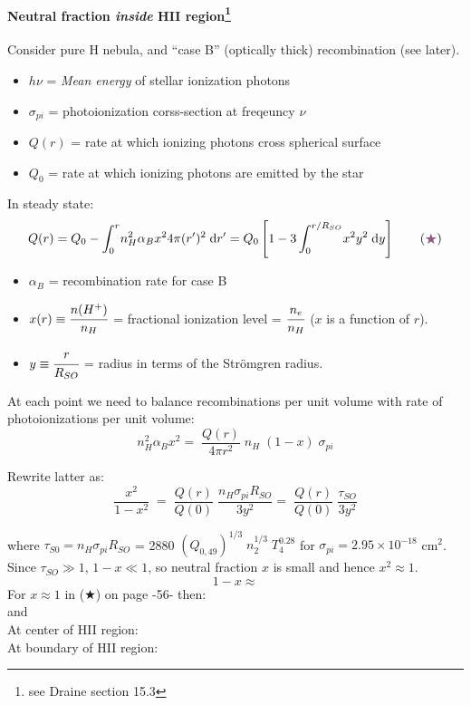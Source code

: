 \documentclass[11pt]{article}
\newcommand{\mar}[1]{\hspace{0pt}\marginpar{-\textcolor{black}{#1}-}}
\begin{document}
\paragraph{Neutral fraction \emph{inside} HII region\footnote{see Draine
section 15.3}}
\mar{56}Consider pure H nebula, and ``case B'' (optically thick)
recombination (see later).
\begin{itemize}
    \item $h\nu$ = \emph{Mean energy} of stellar ionization photons
    \item $\sigma_{pi}$ = photoionization corss-section at freqeuncy $\nu$
    \item $Q(r)$ = rate at which ionizing photons cross spherical surface
    \item $Q_{0}$ = rate at which ionizing photons are emitted by the star
\end{itemize}
In steady state:
\[
    Q(r)
    = Q_{0} - \int_{0}^{r}{\!
        n_{H}^{2} \alpha_{B} x^{2} 4\pi(r')^{2} \;\mathrm{d}r'}
    = Q_{0} \left[ 1 - 3\int_{0}^{r/R_{SO}}{\!
        x^{2}y^{2} \;\mathrm{d}y} \right]
    \qquad (\textcolor{mypur}{\bigstar})
    \]
\begin{itemize}[itemsep=1ex]
    \item $\alpha_{B}$ = recombination rate for case B
    \item $x(r) \equiv \cfrac{n(H^{+})}{n_{H}}$ = fractional ionization level
        = $\cfrac{n_{e}}{n_{H}}$ ($x$ is a function of $r$).
    \item $y \equiv \cfrac{r}{R_{SO}}$ = radius in terms of the
        Str\"{o}mgren radius.
\end{itemize}
At each point we need to balance recombinations per unit volume with rate of
photoionizations per unit volume:
\[
    n_{H}^{2} \alpha_{B} x^{2}
    =\; \frac{Q(r)}{4{\pi}r^{2}}\; n_{H}\; (1-x)\; \sigma_{pi}
    \]

\mar{57}Rewrite latter as:
\[
    \frac{x^{2}}{1-x^{2}}\;
    =\; \frac{Q(r)}{Q(0)}\; \frac{n_{H} \sigma_{pi} R_{SO}}{3y^{2}}
    =\; \frac{Q(r)}{Q(0)}\; \frac{\tau_{SO}}{3y^{2}}
    \]

where $\tau_{S0} = n_{H}\sigma_{pi}R_{SO}$
= 2880 $(Q_{0,49})^{1/3}\; n_{2}^{1/3}\; T_{4}^{0.28}$
for $\sigma_{pi} = 2.95 \times 10^{-18}$ cm$^{2}$.
Since $\tau_{SO} \gg 1$, $1-x \ll 1$,
so neutral fraction $x$ is small and hence $x^{2} \approx 1$.
\[
    1 - x \approx
    \]
For $x \approx 1$ in (\textcolor{mypur}{$\bigstar$}) on page -56- then:
\[
    \]
and
\[
    \]
At center of HII region:
\[
    \]
At boundary of HII region:
\[
    \]
\end{document}
